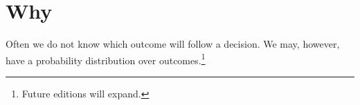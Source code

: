 
\section*{Why}

Often we do not know which outcome will follow a decision.
We may, however, have a probability distribution over outcomes.\footnote{Future editions will expand.}

\blankpage